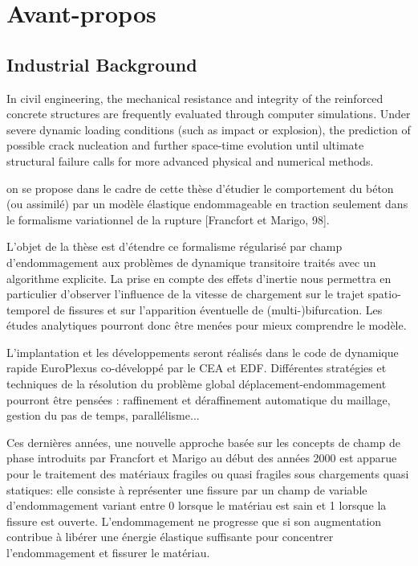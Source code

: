 \chapter{Avant-propos}

\section*{Industrial Background}
In civil engineering, the mechanical resistance and integrity of the reinforced concrete structures are frequently evaluated through computer simulations. Under severe dynamic loading conditions (such as impact or explosion), the prediction of possible crack nucleation and further space-time evolution until ultimate structural failure calls for more advanced physical and numerical methods.



on se propose dans le cadre de cette thèse d'étudier le comportement du béton (ou assimilé)
par un modèle élastique endommageable en traction seulement dans le formalisme variationnel de la rupture [Francfort et Marigo, 98].

L'objet de la thèse est d'étendre ce formalisme régularisé par champ d'endommagement aux problèmes de dynamique transitoire traités avec un
algorithme explicite. La prise en compte des effets d'inertie nous permettra en particulier d'observer l'influence de la vitesse de chargement sur le trajet spatio-temporel
de fissures et sur l'apparition éventuelle de (multi-)bifurcation. Les études analytiques pourront donc être menées pour mieux comprendre le modèle.

L'implantation et les développements seront réalisés dans le code de dynamique rapide EuroPlexus co-développé par le CEA et EDF. Différentes stratégies et techniques
de la résolution du problème global déplacement-endommagement pourront être pensées : raffinement et déraffinement automatique du maillage, gestion du pas de temps,
parallélisme...

Ces dernières années, une nouvelle approche basée sur les concepts de champ de phase introduits
par Francfort et Marigo au début des années 2000 est apparue pour le traitement des matériaux
fragiles ou quasi fragiles sous chargements quasi statiques: elle consiste à représenter une fissure par
un champ de variable d’endommagement variant entre 0 lorsque le matériau est sain et 1 lorsque la
fissure est ouverte. L’endommagement ne progresse que si son augmentation contribue à libérer
une énergie élastique suffisante pour concentrer l’endommagement et fissurer le matériau.

